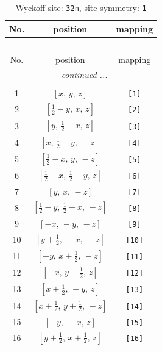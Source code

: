 \documentclass[fleqn,8pt]{jsarticle}
\begin{document}
\renewcommand{\arraystretch}{1.2}
\begin{longtable}{ccc}
\caption{Wyckoff site: {\tt 32n}, site symmetry: {\tt 1}}
 \\
 \hline \hline
No. & position & mapping \\ \hline \endfirsthead

\multicolumn{2}{l}{\tablename\ \thetable{}} \\
 \hline \hline
No. & position & mapping \\ \hline \endhead

 \hline \hline
\multicolumn{2}{r}{\footnotesize\it continued ...} \\ \endfoot

 \hline \hline
\multicolumn{2}{r}{} \\ \endlastfoot

1 & $\left[ x,\, y,\, z \right]$ & {\tt [1]} \\ \hline
2 & $\left[ \frac{1}{2} - y,\, x,\, z \right]$ & {\tt [2]} \\ \hline
3 & $\left[ y,\, \frac{1}{2} - x,\, z \right]$ & {\tt [3]} \\ \hline
4 & $\left[ x,\, \frac{1}{2} - y,\, - z \right]$ & {\tt [4]} \\ \hline
5 & $\left[ \frac{1}{2} - x,\, y,\, - z \right]$ & {\tt [5]} \\ \hline
6 & $\left[ \frac{1}{2} - x,\, \frac{1}{2} - y,\, z \right]$ & {\tt [6]} \\ \hline
7 & $\left[ y,\, x,\, - z \right]$ & {\tt [7]} \\ \hline
8 & $\left[ \frac{1}{2} - y,\, \frac{1}{2} - x,\, - z \right]$ & {\tt [8]} \\ \hline
9 & $\left[ - x,\, - y,\, - z \right]$ & {\tt [9]} \\ \hline
10 & $\left[ y + \frac{1}{2},\, - x,\, - z \right]$ & {\tt [10]} \\ \hline
11 & $\left[ - y,\, x + \frac{1}{2},\, - z \right]$ & {\tt [11]} \\ \hline
12 & $\left[ - x,\, y + \frac{1}{2},\, z \right]$ & {\tt [12]} \\ \hline
13 & $\left[ x + \frac{1}{2},\, - y,\, z \right]$ & {\tt [13]} \\ \hline
14 & $\left[ x + \frac{1}{2},\, y + \frac{1}{2},\, - z \right]$ & {\tt [14]} \\ \hline
15 & $\left[ - y,\, - x,\, z \right]$ & {\tt [15]} \\ \hline
16 & $\left[ y + \frac{1}{2},\, x + \frac{1}{2},\, z \right]$ & {\tt [16]} \\ \hline

\end{longtable}
\end{document}
